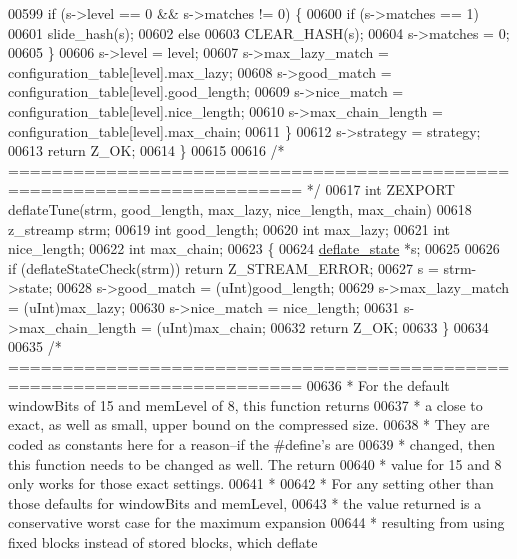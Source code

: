\begin{DoxyCode}
00599         \textcolor{keywordflow}{if} (s->level == 0 && s->matches != 0) \{
00600             \textcolor{keywordflow}{if} (s->matches == 1)
00601                 slide\_hash(s);
00602             \textcolor{keywordflow}{else}
00603                 CLEAR\_HASH(s);
00604             s->matches = 0;
00605         \}
00606         s->level = level;
00607         s->max\_lazy\_match   = configuration\_table[level].max\_lazy;
00608         s->good\_match       = configuration\_table[level].good\_length;
00609         s->nice\_match       = configuration\_table[level].nice\_length;
00610         s->max\_chain\_length = configuration\_table[level].max\_chain;
00611     \}
00612     s->strategy = strategy;
00613     \textcolor{keywordflow}{return} Z\_OK;
00614 \}
00615 
00616 \textcolor{comment}{/* ========================================================================= */}
00617 \textcolor{keywordtype}{int} ZEXPORT deflateTune(strm, good\_length, max\_lazy, nice\_length, max\_chain)
00618     z\_streamp strm;
00619     \textcolor{keywordtype}{int} good\_length;
00620     \textcolor{keywordtype}{int} max\_lazy;
00621     \textcolor{keywordtype}{int} nice\_length;
00622     \textcolor{keywordtype}{int} max\_chain;
00623 \{
00624     \hyperlink{structinternal__state}{deflate\_state} *s;
00625 
00626     \textcolor{keywordflow}{if} (deflateStateCheck(strm)) \textcolor{keywordflow}{return} Z\_STREAM\_ERROR;
00627     s = strm->state;
00628     s->good\_match = (uInt)good\_length;
00629     s->max\_lazy\_match = (uInt)max\_lazy;
00630     s->nice\_match = nice\_length;
00631     s->max\_chain\_length = (uInt)max\_chain;
00632     \textcolor{keywordflow}{return} Z\_OK;
00633 \}
00634 
00635 \textcolor{comment}{/* =========================================================================}
00636 \textcolor{comment}{ * For the default windowBits of 15 and memLevel of 8, this function returns}
00637 \textcolor{comment}{ * a close to exact, as well as small, upper bound on the compressed size.}
00638 \textcolor{comment}{ * They are coded as constants here for a reason--if the #define's are}
00639 \textcolor{comment}{ * changed, then this function needs to be changed as well.  The return}
00640 \textcolor{comment}{ * value for 15 and 8 only works for those exact settings.}
00641 \textcolor{comment}{ *}
00642 \textcolor{comment}{ * For any setting other than those defaults for windowBits and memLevel,}
00643 \textcolor{comment}{ * the value returned is a conservative worst case for the maximum expansion}
00644 \textcolor{comment}{ * resulting from using fixed blocks instead of stored blocks, which deflate}

\end{DoxyCode}
